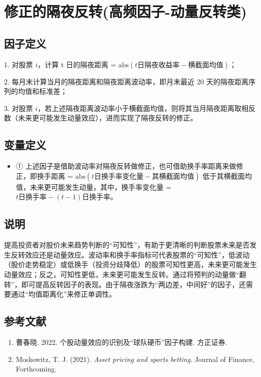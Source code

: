 \documentclass{article}
\begin{document}
\section{修正的隔夜反转(高频因子-动量反转类)}

\subsection{因子定义}

1. 对股票 \( i \)，计算 t 日的隔夜距离 = \(\mathrm{abs}(t\text{日隔夜收益率} - \text{横截面均值})\)；

2. 每月末计算当月的隔夜距离和隔夜距离波动率，即月末最近 20 天的隔夜距离序列的均值和标准差；

3. 对股票 \( i \)，若上述隔夜距离波动率小于横截面均值，则将其当月隔夜距离取相反数（未来更可能发生动量效应），进而实现了隔夜反转的修正。

\subsection{变量定义}
\begin{itemize}
    \item ① 上述因子是借助波动率对隔夜反转做修正，也可借助换手率距离来做修正，即换手距离 = \(\mathrm{abs}(t\text{日换手率变化量} - \text{其横截面均值})\) 低于其横截面均值，未来更可能发生动量，其中，换手率变化量 = \(t\text{日换手率} - (t-1)\text{日换手率}\)。
\end{itemize}

\subsection{说明}
提高投资者对股价未来趋势判断的“可知性”，有助于更清晰的判断股票未来是否发生反转效应还是动量效应。波动率和换手率指标可代表股票的“可知性”，低波动（股价走势稳定）或低换手（投资分歧降低）的股票可知性更高，未来更可能发生动量效应；反之，可知性更低，未来更可能发生反转。通过将预判的动量做“翻转”，即可提高反转因子的表现。由于隔夜涨跌为“两边差，中间好”的因子，还需要通过“均值距离化”来修正单调性。

\subsection{参考文献}
\begin{enumerate}
    \item 曹春晓. 2022. 个股动量效应的识别及“球队硬币”因子构建. 方正证券.
    \item Moskowitz, T. J. (2021). \textit{Asset pricing and sports betting}. Journal of Finance, Forthcoming.
\end{enumerate}
\end{document}
